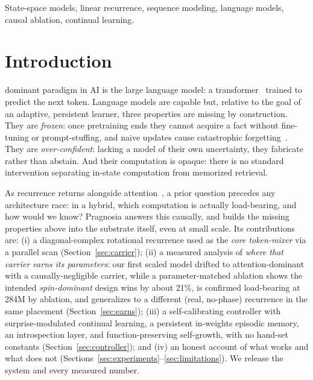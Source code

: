 \documentclass[journal]{IEEEtran}
\begin{document}
\begin{IEEEkeywords}
State-space models, linear recurrence, sequence modeling, language models, causal ablation, continual learning.
\end{IEEEkeywords}

\section{Introduction}
 dominant paradigm in AI is the large language model: a transformer~\cite{vaswani2017} trained to predict the next token. Language models are capable but, relative to the goal of an adaptive, persistent learner, three properties are missing by construction. They are \emph{frozen}: once pretraining ends they cannot acquire a fact without fine-tuning or prompt-stuffing, and naive updates cause catastrophic forgetting~\cite{mccloskey1989}. They are \emph{over-confident}: lacking a model of their own uncertainty, they fabricate rather than abstain. And their computation is opaque: there is no standard intervention separating in-state computation from memorized retrieval.

As recurrence returns alongside attention~\cite{tiezzi2025recurrent}, a prior question precedes any architecture race: in a hybrid, which computation is actually load-bearing, and how would we know? Pragnosia answers this causally, and builds the missing properties above into the substrate itself, even at small scale. Its contributions are: (i) a diagonal-complex rotational recurrence used as the \emph{core token-mixer} via a parallel scan (Section~\ref{sec:carrier}); (ii) a measured analysis of \emph{where that carrier earns its parameters}: our first scaled model drifted to attention-dominant with a causally-negligible carrier, while a parameter-matched ablation shows the intended \emph{spin-dominant} design wins by about 21\%, is confirmed load-bearing at 284M by ablation, and generalizes to a different (real, no-phase) recurrence in the same placement (Section~\ref{sec:earns}); (iii) a self-calibrating controller with surprise-modulated continual learning, a persistent in-weights episodic memory, an introspection layer, and function-preserving self-growth, with no hand-set constants (Section~\ref{sec:controller}); and (iv) an honest account of what works and what does not (Sections~\ref{sec:experiments}--\ref{sec:limitations}). We release the system and every measured number.
\end{document}
